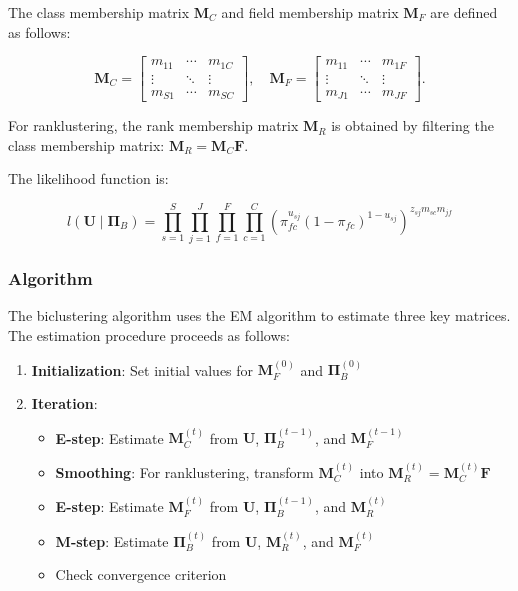 The class membership matrix \(\mathbf{M}_C\) and field membership matrix \(\mathbf{M}_F\) are defined as follows:

\[
\mathbf{M}_C=\left[\begin{array}{ccc}
m_{11} & \cdots & m_{1C} \\
\vdots & \ddots & \vdots \\
m_{S1} & \cdots & m_{SC}
\end{array}\right], \quad
\mathbf{M}_F=\left[\begin{array}{ccc}
m_{11} & \cdots & m_{1F} \\
\vdots & \ddots & \vdots \\
m_{J1} & \cdots & m_{JF}
\end{array}\right].
\]

For ranklustering, the rank membership matrix \(\mathbf{M}_R\) is obtained by filtering the class membership matrix: \(\mathbf{M}_R = \mathbf{M}_C \mathbf{F}\).

The likelihood function is:

\[
l(\mathbf{U}\mid \boldsymbol{\Pi}_B) = \prod_{s=1}^S\prod_{j=1}^J\prod_{f=1}^F\prod_{c=1}^C \left(\pi_{fc}^{u_{sj}} (1-\pi_{fc})^{1-u_{sj}}\right)^{z_{sj} m_{sc} m_{jf}}
\]

\subsubsection{Algorithm}\label{algorithm-1}

The biclustering algorithm uses the EM algorithm to estimate three key matrices. The estimation procedure proceeds as follows:

\begin{enumerate}
\def\labelenumi{\arabic{enumi}.}
\tightlist
\item
  \textbf{Initialization}: Set initial values for \(\mathbf{M}_F^{(0)}\) and \(\boldsymbol{\Pi}_B^{(0)}\)
\item
  \textbf{Iteration}:

  \begin{itemize}
  \tightlist
  \item
    \textbf{E-step}: Estimate \(\mathbf{M}_C^{(t)}\) from \(\mathbf{U}\), \(\boldsymbol{\Pi}_B^{(t-1)}\), and \(\mathbf{M}_F^{(t-1)}\)
  \item
    \textbf{Smoothing}: For ranklustering, transform \(\mathbf{M}_C^{(t)}\) into \(\mathbf{M}_R^{(t)} = \mathbf{M}_C^{(t)}\mathbf{F}\)
  \item
    \textbf{E-step}: Estimate \(\mathbf{M}_F^{(t)}\) from \(\mathbf{U}\), \(\boldsymbol{\Pi}_B^{(t-1)}\), and \(\mathbf{M}_R^{(t)}\)
  \item
    \textbf{M-step}: Estimate \(\boldsymbol{\Pi}_B^{(t)}\) from \(\mathbf{U}\), \(\mathbf{M}_R^{(t)}\), and \(\mathbf{M}_F^{(t)}\)
  \item
    Check convergence criterion
  \end{itemize}
\end{enumerate}

